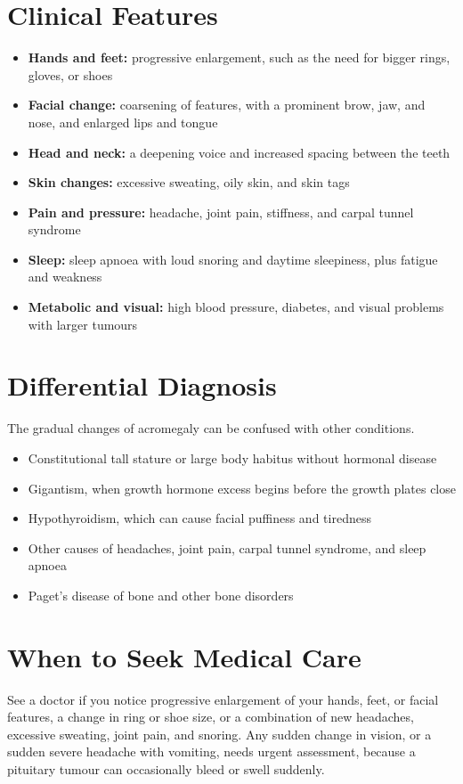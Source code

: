 \section*{Clinical Features}
\begin{itemize}
    \item \textbf{Hands and feet:} progressive enlargement, such as the need for bigger rings, gloves, or shoes
    \item \textbf{Facial change:} coarsening of features, with a prominent brow, jaw, and nose, and enlarged lips and tongue
    \item \textbf{Head and neck:} a deepening voice and increased spacing between the teeth
    \item \textbf{Skin changes:} excessive sweating, oily skin, and skin tags
    \item \textbf{Pain and pressure:} headache, joint pain, stiffness, and carpal tunnel syndrome
    \item \textbf{Sleep:} sleep apnoea with loud snoring and daytime sleepiness, plus fatigue and weakness
    \item \textbf{Metabolic and visual:} high blood pressure, diabetes, and visual problems with larger tumours
\end{itemize}

\section*{Differential Diagnosis}
The gradual changes of acromegaly can be confused with other conditions.

\begin{itemize}
    \item Constitutional tall stature or large body habitus without hormonal disease
    \item Gigantism, when growth hormone excess begins before the growth plates close
    \item Hypothyroidism, which can cause facial puffiness and tiredness
    \item Other causes of headaches, joint pain, carpal tunnel syndrome, and sleep apnoea
    \item Paget's disease of bone and other bone disorders
\end{itemize}

\section*{When to Seek Medical Care}
See a doctor if you notice progressive enlargement of your hands, feet, or facial features, a change in ring or shoe size, or a combination of new headaches, excessive sweating, joint pain, and snoring. Any sudden change in vision, or a sudden severe headache with vomiting, needs urgent assessment, because a pituitary tumour can occasionally bleed or swell suddenly.

